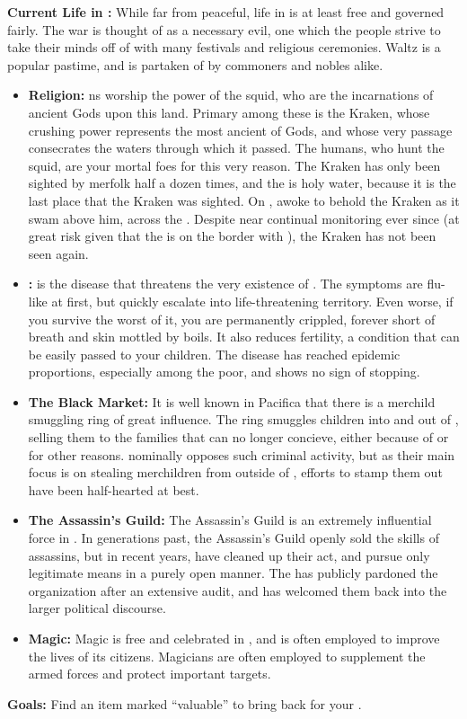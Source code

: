 \documentclass[blue]{NeptuneBall}
\begin{document}
{\bf Current Life in \pPacifica{}:}
While far from peaceful, life in \pPacifica{} is at least free and governed fairly. The war is thought of as a necessary evil, one which the people strive to take their minds off of with many festivals and religious ceremonies. Waltz is a popular pastime, and is partaken of by commoners and nobles alike.\\

\begin{itemize}
  \item {\bf Religion:} \pPacifica{}ns worship the power of the squid, who are the incarnations of ancient Gods upon this land. Primary among these is the Kraken, whose crushing power represents the most ancient of Gods, and whose very passage consecrates the waters through which it passed. The humans, who hunt the squid, are your mortal foes for this very reason. The Kraken has only been sighted by merfolk half a dozen times, and the \pGazaStrip{} is holy water, because it is the last place that the Kraken was sighted. On \cKraken{\MYname}, \cLiar{\MYname} awoke to behold the Kraken as it swam above him, across the \pGazaStrip{}. Despite near continual monitoring ever since (at great risk given that the \pGazaStrip{} is on the border with \pAtlantis{}), the Kraken has not been seen again.
  \item {\bf \cPolio{}:} \cPolio{} is the disease that threatens the very existence of \pPacifica{}. The symptoms are flu-like at first, but quickly escalate into life-threatening territory. Even worse, if you survive the worst of it, you are permanently crippled, forever short of breath and skin mottled by boils. It also reduces fertility, a condition that can be easily passed to your children. The disease has reached epidemic proportions, especially among the poor, and shows no sign of stopping. 
  \item {\bf The Black Market:} It is well known in Pacifica that there is a merchild smuggling ring of great influence. The ring smuggles children into and out of \pPacifica{}, selling them to the families that can no longer concieve, either because of \cPolio{} or for other reasons. \cPacificanRuler{\King} \cPacificanRuler{} nominally opposes such criminal activity, but as their main focus is on stealing merchildren from outside of \pPacifica{}, efforts to stamp them out have been half-hearted at best.
  \item {\bf The Assassin's Guild:} The Assassin's Guild is an extremely influential force in \pPacifica{}. In generations past, the Assassin's Guild openly sold the skills of assassins, but in recent years, have cleaned up their act, and pursue only legitimate means in a purely open manner. The \cPacificanRuler{\King} has publicly pardoned the organization after an extensive audit, and has welcomed them back into the larger political discourse.
  \item {\bf Magic:} Magic is free and celebrated in \pPacifica{}, and is often employed to improve the lives of its citizens. Magicians are often employed to supplement the armed forces and protect important targets.
\end{itemize}

{\bf Goals:} Find an item marked "`valuable"' to bring back for your \cPacificanRuler{\King}.
\end{document}
